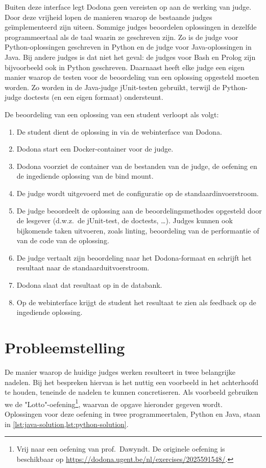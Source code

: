 Buiten deze interface legt Dodona geen vereisten op aan de werking van judge.
Door deze vrijheid lopen de manieren waarop de bestaande judges geïmplementeerd zijn uiteen.
Sommige judges beoordelen oplossingen in dezelfde programmeertaal als de taal waarin ze geschreven zijn.
Zo is de judge voor Python-oplossingen geschreven in Python en de judge voor Java-oplossingen in Java.
Bij andere judges is dat niet het geval: de judges voor Bash en Prolog zijn bijvoorbeeld ook in Python geschreven.
Daarnaast heeft elke judge een eigen manier waarop de testen voor de beoordeling van een oplossing opgesteld moeten worden.
Zo worden in de Java-judge jUnit-testen gebruikt, terwijl de Python-judge doctests (en een eigen formaat) ondersteunt.

De beoordeling van een oplossing van een student verloopt als volgt:

\begin{enumerate}
    \item De student dient de oplossing in via de webinterface van Dodona.
    \item Dodona start een Docker-container voor de judge.
    \item Dodona voorziet de container van de bestanden van de judge, de oefening en de ingediende oplossing van de bind mount.
    \item De judge wordt uitgevoerd met de configuratie op de standaardinvoerstroom.
    \item De judge beoordeelt de oplossing aan de beoordelingsmethodes opgesteld door de lesgever (d.w.z.\ de jUnit-test, de doctests, \ldots).
    Judges kunnen ook bijkomende taken uitvoeren, zoals linting, beoordeling van de performantie of  van de code van de oplossing.
    \item De judge vertaalt zijn beoordeling naar het Dodona-formaat en schrijft het resultaat naar de standaarduitvoerstroom.
    \item Dodona slaat dat resultaat op in de databank.
    \item Op de webinterface krijgt de student het resultaat te zien als feedback op de ingediende oplossing.
\end{enumerate}

\section{Probleemstelling}\label{sec:probleemstelling}

De manier waarop de huidige judges werken resulteert in twee belangrijke nadelen.
Bij het bespreken hiervan is het nuttig een voorbeeld in het achterhoofd te houden, teneinde de nadelen te kunnen concretiseren.
Als voorbeeld gebruiken we de "Lotto"-oefening\footnote{Vrij naar een oefening van prof.\ Dawyndt.
De originele oefening is beschikbaar op \url{https://dodona.ugent.be/nl/exercises/2025591548/}.}, waarvan de opgave hieronder gegeven wordt.
Oplossingen voor deze oefening in twee programmeertalen, Python en Java, staan in \cref{lst:java-solution,lst:python-solution}.


